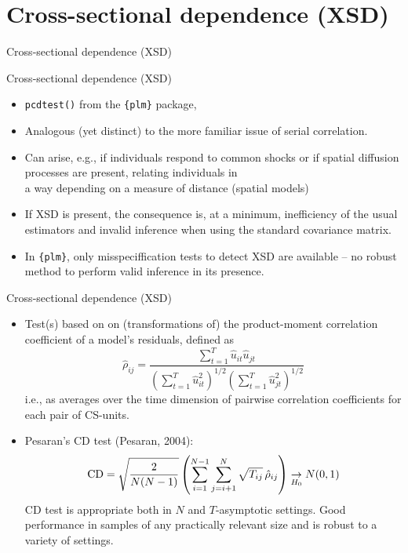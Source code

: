 \documentclass{beamer}
\begin{document}
\section{Cross-sectional dependence (XSD)}
\begin{frame}{Cross-sectional dependence (XSD)}
\end{frame}
\begin{frame}{Cross-sectional dependence (XSD)}
\begin{itemize}
    \item \texttt{pcdtest()} from the \texttt{\{plm\}} package, 
    \item Analogous (yet distinct) to the more familiar issue of serial correlation.
    \smallskip
    \item Can arise, e.g., if individuals respond to common shocks or if spatial diffusion processes are present, relating individuals in \\a way depending on a measure of distance (spatial models)
    \smallskip
    \item If XSD is present, the consequence is, at a minimum, inefficiency of the usual estimators and invalid inference when using the standard covariance matrix.
    \smallskip
    \item In \texttt{\{plm\}}, only misspeciffication tests to detect XSD are available – no robust method to perform valid inference in its presence.
\end{itemize}
\end{frame}
\begin{frame}{Cross-sectional dependence (XSD)}
\begin{itemize}
    \item Test(s) based on on (transformations of) the product-moment correlation coefficient of a model's residuals, defined as
    $$
    \hat{\rho}_{ij}=\frac{\sum_{t=1}^T \hat{u}_{it}\hat{u}_{jt}}
    {\left(\sum_{t=1}^T \hat{u}_{it}^2 \right)^{1/2} \left(\sum_{t=1}^T \hat{u}_{jt}^2 \right)^{1/2} }
    $$
    i.e., as averages over the time dimension of pairwise correlation coefficients for each pair of CS-units.
    \medskip
    \item Pesaran's CD test (Pesaran, 2004):
    $$
    \textnormal{CD} = \sqrt{\frac{2}{N(N-1)}}
    \left( \sum_{i=1}^{N-1} \sum_{j=i+1}^N \sqrt{T_{ij}}\, \hat{\rho}_{ij}
    \right)  \underset{H_0}{\rightarrow} N(0,1)
    $$
    CD test is appropriate both in $N$ and $T$-asymptotic settings. Good performance in samples of any practically relevant size and is robust to a variety of settings.
\end{itemize}
\end{frame}






















\end{document}

